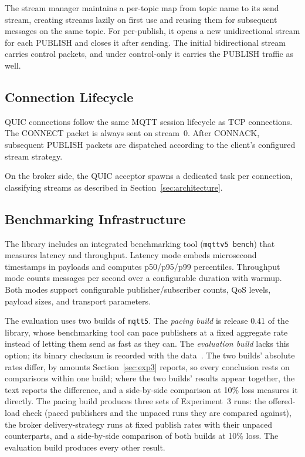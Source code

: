 \documentclass[a4paper,fleqn]{cas-dc}
\begin{document}
The stream manager maintains a per-topic map from topic name to its send stream, creating streams lazily on first use and reusing them for subsequent messages on the same topic. For per-publish, it opens a new unidirectional stream for each PUBLISH and closes it after sending. The initial bidirectional stream carries control packets, and under control-only it carries the PUBLISH traffic as well.

\subsection{Connection Lifecycle}

QUIC connections follow the same MQTT session lifecycle as TCP connections. The CONNECT packet is always sent on stream~0. After CONNACK, subsequent PUBLISH packets are dispatched according to the client's configured stream strategy.

On the broker side, the QUIC acceptor spawns a dedicated task per connection, classifying streams as described in Section~\ref{sec:architecture}.

\subsection{Benchmarking Infrastructure}
\label{sec:bench-infra}

The library includes an integrated benchmarking tool (\texttt{mqttv5 bench}) that measures latency and throughput. Latency mode embeds microsecond timestamps in payloads and computes p50/p95/p99 percentiles. Throughput mode counts messages per second over a configurable duration with warmup. Both modes support configurable publisher/subscriber counts, QoS levels, payload sizes, and transport parameters.

The evaluation uses two builds of \texttt{mqtt5}. The \emph{pacing build} is release 0.41 of the library, whose benchmarking tool can pace publishers at a fixed aggregate rate instead of letting them send as fast as they can. The \emph{evaluation build} lacks this option; its binary checksum is recorded with the data~\cite{bracht2026zenodo}. The two builds' absolute rates differ, by amounts Section~\ref{sec:exp3} reports, so every conclusion rests on comparisons within one build; where the two builds' results appear together, the text reports the difference, and a side-by-side comparison at 10\% loss measures it directly. The pacing build produces three sets of Experiment~3 runs: the offered-load check (paced publishers and the unpaced runs they are compared against), the broker delivery-strategy runs at fixed publish rates with their unpaced counterparts, and a side-by-side comparison of both builds at 10\% loss. The evaluation build produces every other result.
\end{document}
